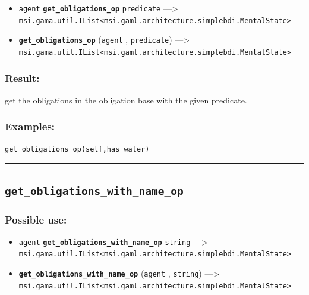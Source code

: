 \documentclass[]{book}
\providecommand{\tightlist}{%
  \setlength{\itemsep}{0pt}\setlength{\parskip}{0pt}}
\theoremstyle{definition}
\theoremstyle{definition}
\theoremstyle{definition}
\theoremstyle{remark}
\begin{document}
\begin{itemize}
\tightlist
\item
  \texttt{agent} \textbf{\texttt{get\_obligations\_op}}
  \texttt{predicate} ---\textgreater{}
  \texttt{msi.gama.util.IList\textless{}msi.gaml.architecture.simplebdi.MentalState\textgreater{}}
\item
  \textbf{\texttt{get\_obligations\_op}} (\texttt{agent} ,
  \texttt{predicate}) ---\textgreater{}
  \texttt{msi.gama.util.IList\textless{}msi.gaml.architecture.simplebdi.MentalState\textgreater{}}
\end{itemize}

\subsubsection{Result:}\label{result-217}

get the obligations in the obligation base with the given predicate.

\subsubsection{Examples:}\label{examples-170}

\begin{verbatim}
get_obligations_op(self,has_water) 
\end{verbatim}

\begin{center}\rule{0.5\linewidth}{\linethickness}\end{center}

\subsection{\texorpdfstring{\texttt{get\_obligations\_with\_name\_op}}{get\_obligations\_with\_name\_op}}\label{get_obligations_with_name_op}

\subsubsection{Possible use:}\label{possible-use-224}

\begin{itemize}
\tightlist
\item
  \texttt{agent} \textbf{\texttt{get\_obligations\_with\_name\_op}}
  \texttt{string} ---\textgreater{}
  \texttt{msi.gama.util.IList\textless{}msi.gaml.architecture.simplebdi.MentalState\textgreater{}}
\item
  \textbf{\texttt{get\_obligations\_with\_name\_op}} (\texttt{agent} ,
  \texttt{string}) ---\textgreater{}
  \texttt{msi.gama.util.IList\textless{}msi.gaml.architecture.simplebdi.MentalState\textgreater{}}
\end{itemize}
\end{document}
